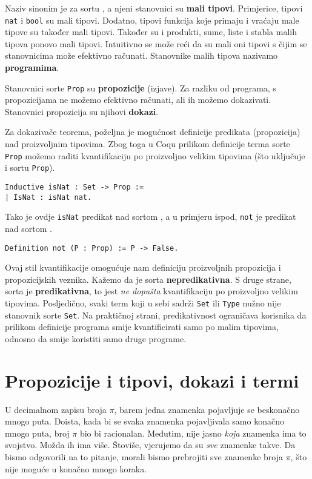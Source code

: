 Naziv \coqset{} sinonim je za sortu , a njeni stanovnici su \textbf{mali tipovi}.
Primjerice, tipovi \texttt{nat} i \texttt{bool} su mali tipovi.
Dodatno, tipovi funkcija koje primaju i vraćaju male tipove su također mali tipovi.
Također su i produkti, sume, liste i stabla malih tipova ponovo mali tipovi.
Intuitivno se može reći da su mali oni tipovi s čijim se stanovnicima može efektivno računati.
Stanovnike malih tipova nazivamo \textbf{programima}.

Stanovnici sorte \texttt{Prop} su \textbf{propozicije} (izjave).
Za razliku od programa, s propozicijama ne možemo efektivno računati, ali ih možemo dokazivati.
Stanovnici propozicija su njihovi \textbf{dokazi}.

Za dokazivače teorema, poželjna je mogućnost definicije predikata (propozicija) nad proizvoljnim tipovima.
Zbog toga u Coqu prilikom definicije terma sorte \texttt{Prop} možemo raditi kvantifikaciju po proizvoljno velikim tipovima
(što uključuje i sortu \texttt{Prop}).
\begin{verbatim}
Inductive isNat : Set -> Prop :=
| IsNat : isNat nat.
\end{verbatim}
\noindent Tako je ovdje \texttt{isNat} predikat nad sortom \coqset{}, a u primjeru ispod, \texttt{not} je predikat nad sortom \coqprop{}.
\begin{verbatim}
Definition not (P : Prop) := P -> False.
\end{verbatim}
\noindent Ovaj stil kvantifikacije omogućuje nam definiciju proizvoljnih propozicija i propozicijskih veznika.
Kažemo da je sorta \coqprop{} \textbf{nepredikativna}.
S druge strane, sorta \coqset{} je \textbf{predikativna}, to jest \textit{ne dopušta} kvantifikaciju po proizvoljno velikim tipovima.
Posljedično, svaki term koji u sebi sadrži \texttt{Set} ili \texttt{Type} nužno nije stanovnik sorte \texttt{Set}.
Na praktičnoj strani, predikativnost ograničava korisnika da prilikom definicije programa smije kvantificirati samo po malim tipovima, odnosno da smije koristiti samo druge programe.


\section{Propozicije i tipovi, dokazi i termi}\label{sec:propozicije-i-tipovi}
U decimalnom zapisu broja \(\pi\), barem jedna znamenka pojavljuje se beskonačno mnogo puta.
Doista, kada bi se svaka znamenka pojavljivala samo konačno mnogo puta, broj \(\pi\) bio bi racionalan.
Međutim, nije jasno \textit{koja} znamenka ima to svojstvo.
Možda ih ima više. Štoviše, vjerujemo da su \textit{sve} znamenke takve.
Da bismo odgovorili na to pitanje, morali bismo prebrojiti sve znamenke broja \(\pi\),
što nije moguće u konačno mnogo koraka.

